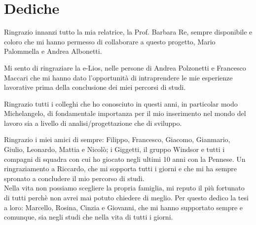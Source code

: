 \documentclass[12pt,a4paper]{report}
\begin{document}
    
    
    
    \clearpage\null\newpage
    
    
    
    \clearpage\null\newpage
    
    
    
    \clearpage\null\newpage
    
    
    
    
    
    \clearpage\null\newpage
    
    
        
    \chapter*{Dediche}
	Ringrazio innanzi tutto la mia relatrice, la Prof. Barbara Re, sempre disponibile e coloro che mi hanno permesso di collaborare a questo progetto, Mario Palommella e Andrea Albonetti.

	Mi sento di ringraziare la e-Lios, nelle persone di Andrea Polzonetti e Francesco Maccari che mi hanno dato l'opportunità di intraprendere le mie esperienze lavorative prima della conclusione dei miei percorsi di studi.

	Ringrazio tutti i colleghi che ho conosciuto in questi anni, in particolar modo Michelangelo, di fondamentale importanza per il mio inserimento nel mondo del lavoro sia a livello di analisi/progettazione che di sviluppo.

	Ringrazio i miei amici di sempre: Filippo, Francesco, Giacomo, Gianmario, Giulio, Leonardo, Mattia e Nicolò; i Giggetti, il gruppo Windsor e tutti i compagni di squadra con cui ho giocato negli ultimi 10 anni con la Pennese. 
	Un ringraziamento a Riccardo, che mi sopporta tutti i giorni e che mi ha sempre spronato a concludere il mio percorso di studi. \\

	Nella vita non possiamo scegliere la propria famiglia, mi reputo il più fortunato di tutti perchè non avrei mai potuto chiedere di meglio.
	Per questo dedico la tesi a loro: Marcello, Rosina, Cinzia e Giovanni, che mi hanno supportato sempre e comunque, sia negli studi che nella vita di tutti i giorni.
\end{document}

